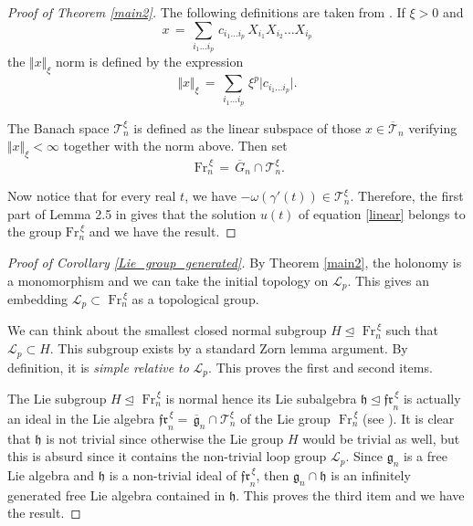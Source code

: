 \documentclass{amsart}
\begin{document}
\begin{proof}[Proof of Theorem \ref{main2}]
The following definitions are taken from \cite{Neretin}. If $\xi>0$ and
\[x\,=\,\sum_{i_1\ldots i_p}\, c_{i_1\ldots {i_p}}\,     X_{i_1}X_{i_2} \ldots X_{i_p} \] 
the $\Vert x\Vert_{\xi}$ norm is defined by the expression
\[\Vert x\Vert_{\xi}\,=\, \sum_{i_1\ldots i_p}\,  {\xi} ^{p}   \vert c_{i_1\ldots {i_p}}\vert. \]

The Banach space ${\mathcal T}_n^{\xi}$ is defined as the linear subspace of those $x\in \overline{\mathcal T}_n$ verifying $\Vert x\Vert_{\xi}<\infty$ together with the norm above. Then set 
\[\mbox{ Fr}_n^{\,\xi}\,=\, \overline{ G}_n\cap {\mathcal T}_n^{\xi}.\]

Now notice that for every real $t$, we have $-\omega(\gamma'(t))\in  {\mathcal T}_n^{\xi} $. Therefore, the first part of Lemma 2.5 in \cite{Neretin} gives that the solution $u(t)$ of equation \eqref{linear} belongs to the group $\mbox{Fr}_n^{\,\xi}$ and we have the result.
\end{proof}
\medskip


\begin{proof}[Proof of Corollary \ref{Lie_group_generated}]
By Theorem \ref{main2}, the holonomy is a monomorphism and we can take the initial topology on $\mathcal{L}_p$. This gives an embedding $\mathcal{L}_p\subset \mbox{ Fr}_n^{\,\xi}$ as a topological group.

We can think about the smallest closed normal subgroup $H\unlhd \mbox{ Fr}_n^{\,\xi}$ such that $\mathcal{L}_p\subset H$. This subgroup exists by a standard Zorn lemma argument. By definition, it is \textit{simple relative to} $\mathcal{L}_p$. This proves the first and second items.


The Lie subgroup $H\unlhd \mbox{ Fr}_n^{\,\xi}$ is normal hence its Lie subalgebra $\mathfrak{h}\unlhd {\mathfrak{fr}}_n^{\,\xi}$ is actually an ideal in the Lie algebra ${\mathfrak{fr}}_n^{\,\xi} = \, \overline{\mathfrak{g}}_n\cap {\mathcal T}_n^{\xi}$ of the Lie group  $\mbox{ Fr}_n^{\,\xi}$ (see \cite{Neretin}). It is clear that $\mathfrak{h}$ is not trivial since otherwise the Lie group $H$ would be trivial as well, but this is absurd since it contains the non-trivial loop group $\mathcal{L}_p$. Since $\mathfrak{g}_n$ is a free Lie algebra and $\mathfrak{h}$ is a non-trivial ideal of ${\mathfrak{fr}}_n^{\,\xi}$, then $\mathfrak{g}_n\cap \mathfrak{h}$ is an infinitely generated free Lie algebra \cite{infinitely_generated} contained in $\mathfrak{h}$. This proves the third item and we have the result.
\end{proof}
\end{document}
